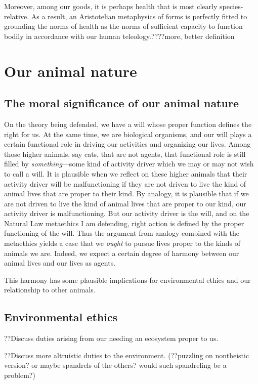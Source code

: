 Moreover, among our goods, it is perhaps health that is most clearly species-relative. As a result, an Aristotelian metaphysics of forms is perfectly fitted to
grounding the norms of health as the norms of sufficient capacity to function bodily in accordance with our human teleology.????more, better definition

\section{Our animal nature}
\subsection{The moral significance of our animal nature}
On the theory being defended, we have a will whose proper function defines the right for us. At the same time, 
we are biological organisms, and our will plays a certain functional role in driving our activities and organizing our 
lives. Among those higher animals, say cats, that are not agents, that functional role is still filled by 
\textit{something}---some kind of activity driver which we may or may not wish to call a will. It is plausible when 
we reflect on these higher animals that their activity driver will be malfunctioning if they are not driven to live the kind
of animal lives that are proper to their kind. By analogy, it is plausible that if we are not driven to live the kind of animal lives
that are proper to our kind, our activity driver is malfunctioning. But our activity driver is the will, and on the Natural Law
metaethics I am defending, right action is defined by the proper functioning of the will. Thus the argument from analogy combined
with the metaethics yields a case that we \textit{ought} to pursue lives proper to the kinds of animals we are. Indeed, we expect
a certain degree of harmony between our animal lives and our lives as agents.

This harmony has some plausible implications for environmental ethics and our relationship to other animals. 

\subsection{Environmental ethics}
??Discuss duties arising from our needing an ecosystem proper to us.

??Discuss more altruistic duties to the environment. (??puzzling on nontheistic version? or maybe spandrels of the others? would
such spandreling be a problem?)



